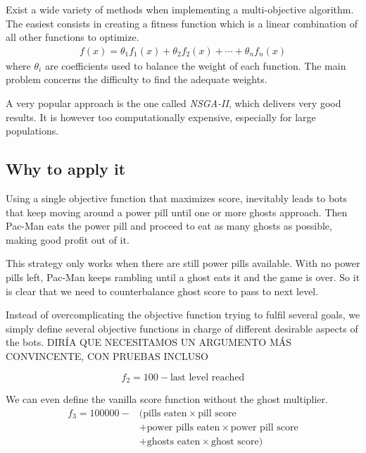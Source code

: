\documentclass{llncs}
\newcommand{\paco}{Pac-Man }
\begin{document}
Exist a wide variety of methods when implementing a multi-objective algorithm. The easiest consists in creating a fitness function which is a linear combination of all other functions to optimize.
\begin{equation}
\begin{aligned}
f(x) = \theta_1f_1(x) +\theta_2f_2(x) +\cdots+\theta_nf_n(x)
\end{aligned}
\end{equation}
where $\theta_i$ are coefficients used to balance the weight of each function. The main problem concerns the difficulty to find the adequate weights.

A very popular approach is the one called \textit{NSGA-II}\cite{nsgapaper}, which delivers very good results. It is however too computationally expensive, especially for large populations.

\subsection{Why to apply it}
Using a single objective function that maximizes score, inevitably leads to bots that keep moving around a power pill until one or more ghosts approach. Then \paco eats the power pill and proceed to eat as many ghosts as possible, making good profit out of it.

This strategy only works when there are still power pills available. With no power pills left, \paco keeps rambling until a ghost eats it and the game is over. So it is clear that we need to counterbalance ghost score to pass to next level.

Instead of overcomplicating the objective function trying to fulfil several goals, we simply define several objective functions in charge of different desirable aspects of the bots.
{\color{red} DIRÍA QUE NECESITAMOS UN ARGUMENTO MÁS CONVINCENTE, CON PRUEBAS INCLUSO}

\begin{equation}
f_2 = 100 - \text{last level reached}
\end{equation}

We can even define the vanilla score function without the ghost multiplier.
\begin{equation}
\begin{split}
f_3 = 100000 - & (\text{pills eaten} \times \text{pill score} \\
& + \text{power pills eaten} \times \text{power pill score} \\
& + \text{ghosts eaten} \times \text{ghost score}) \\
\end{split}
\end{equation}
\end{document}
